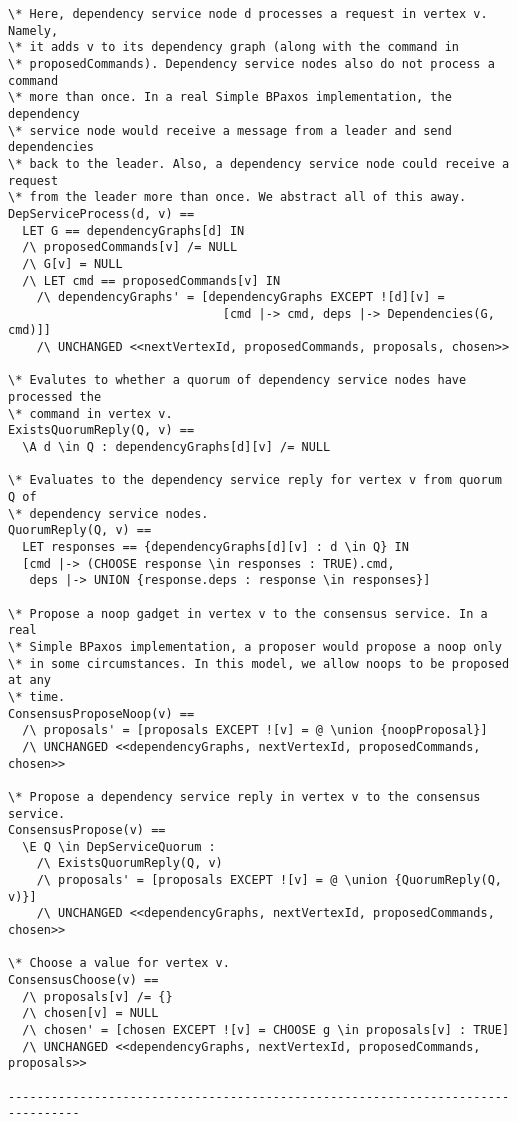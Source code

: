 \begin{verbatim}
\* Here, dependency service node d processes a request in vertex v. Namely,
\* it adds v to its dependency graph (along with the command in
\* proposedCommands). Dependency service nodes also do not process a command
\* more than once. In a real Simple BPaxos implementation, the dependency
\* service node would receive a message from a leader and send dependencies
\* back to the leader. Also, a dependency service node could receive a request
\* from the leader more than once. We abstract all of this away.
DepServiceProcess(d, v) ==
  LET G == dependencyGraphs[d] IN
  /\ proposedCommands[v] /= NULL
  /\ G[v] = NULL
  /\ LET cmd == proposedCommands[v] IN
    /\ dependencyGraphs' = [dependencyGraphs EXCEPT ![d][v] =
                              [cmd |-> cmd, deps |-> Dependencies(G, cmd)]]
    /\ UNCHANGED <<nextVertexId, proposedCommands, proposals, chosen>>

\* Evalutes to whether a quorum of dependency service nodes have processed the
\* command in vertex v.
ExistsQuorumReply(Q, v) ==
  \A d \in Q : dependencyGraphs[d][v] /= NULL

\* Evaluates to the dependency service reply for vertex v from quorum Q of
\* dependency service nodes.
QuorumReply(Q, v) ==
  LET responses == {dependencyGraphs[d][v] : d \in Q} IN
  [cmd |-> (CHOOSE response \in responses : TRUE).cmd,
   deps |-> UNION {response.deps : response \in responses}]

\* Propose a noop gadget in vertex v to the consensus service. In a real
\* Simple BPaxos implementation, a proposer would propose a noop only
\* in some circumstances. In this model, we allow noops to be proposed at any
\* time.
ConsensusProposeNoop(v) ==
  /\ proposals' = [proposals EXCEPT ![v] = @ \union {noopProposal}]
  /\ UNCHANGED <<dependencyGraphs, nextVertexId, proposedCommands, chosen>>

\* Propose a dependency service reply in vertex v to the consensus service.
ConsensusPropose(v) ==
  \E Q \in DepServiceQuorum :
    /\ ExistsQuorumReply(Q, v)
    /\ proposals' = [proposals EXCEPT ![v] = @ \union {QuorumReply(Q, v)}]
    /\ UNCHANGED <<dependencyGraphs, nextVertexId, proposedCommands, chosen>>

\* Choose a value for vertex v.
ConsensusChoose(v) ==
  /\ proposals[v] /= {}
  /\ chosen[v] = NULL
  /\ chosen' = [chosen EXCEPT ![v] = CHOOSE g \in proposals[v] : TRUE]
  /\ UNCHANGED <<dependencyGraphs, nextVertexId, proposedCommands, proposals>>

--------------------------------------------------------------------------------


\end{verbatim}
